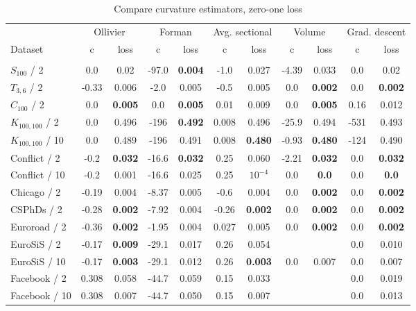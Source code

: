 \documentclass{article} %
\begin{document}
\begin{table}[t]
\caption{Compare curvature estimators, zero-one loss}
\label{tab:compare_zero_one}
\begin{center}
\begin{tabular}{lcccccccc|cc}
&
\multicolumn{2}{c}{Ollivier} &
\multicolumn{2}{c}{Forman} &
\multicolumn{2}{c}{Avg. sectional} &
\multicolumn{2}{c}{Volume} &
\multicolumn{2}{|c}{Grad. descent} 
\\
Dataset & c & loss  & c & loss  & c & loss & c & loss & c & loss  
\\
\hline \\
$S_{100}$ / 2 &
0.0 & 0.02 & 
-97.0 & \textbf{0.004} & 
-1.0 & 0.027 &
-4.39 & 0.033 &
0.0 & 0.02
\\
$T_{3,6}$ / 2 &
-0.33 & 0.006 & 
-2.0 & 0.005 & 
-0.5 & 0.005 & 
0.0 & \textbf{0.002}  &
0.0 & \textbf{0.002}  
\\
$C_{100}$ / 2 & 
0.0 & \textbf{0.005} & 
0.0 & \textbf{0.005} &
0.01 & 0.009 & 
0.0 & \textbf{0.005} &
0.16 & 0.012
\\
$K_{100,100}$ / 2 &
0.0 & 0.496 & 
-196 & \textbf{0.492} & 
0.008 & 0.496 & 
-25.9 & 0.494 & 
-531 & 0.493 
\\
$K_{100,100}$ / 10 &
0.0 & 0.489 & 
-196 & 0.491 & 
0.008 & \textbf{0.480} & 
-0.93 & \textbf{0.480} &
-124 & 0.490 
\\
Conflict / 2 &
-0.2 & \textbf{0.032} &
-16.6 &\textbf{0.032} &
0.25 & 0.060 &
-2.21 & \textbf{0.032} &
0.0 & \textbf{0.032} \\
Conflict / 10 &
-0.2 & 0.001 &
-16.6 &	0.025 &
0.25 & $10^{-4}$ &
0.0 & \textbf{0.0} &
0.0 & \textbf{0.0}  \\
Chicago / 2 &
-0.19 & 0.004 & 
-8.37 & 0.005 & 
-0.6 & 0.004 & 
0.0 & \textbf{0.002} &
0.0 & \textbf{0.002}  \\
CSPhDs / 2 &
-0.28 &	\textbf{0.002} &
-7.92 &	0.004 &
-0.26 & \textbf{0.002} &
0.0 & \textbf{0.002} &
0.0 & \textbf{0.002}  \\
Euroroad / 2 &
-0.36 &	\textbf{0.002} &
-1.95 &	0.004 &
0.027 &	0.005 &
0.0 & \textbf{0.002} &
0.0 & \textbf{0.002} \\
EuroSiS / 2 &
-0.17 & \textbf{0.009} & 
-29.1 & 0.017 & 
0.26 & 0.054 & 
&&
0.0 & 0.010  \\
EuroSiS / 10 &
-0.17 & \textbf{0.003} & 
-29.1 & 0.012 & 
0.26 & \textbf{0.003} & 
0.0 & 0.007 &
0.0 & 0.007\\
Facebook / 2 &
0.308 & 0.058 & 
-44.7 & 0.059 & 
0.15 & 0.033 & 
&&
0.0 & 0.019 \\
Facebook / 10 &
0.308 & 0.007 & 
-44.7 & 0.050 & 
0.15 & 0.007 & 
&&
0.0 & 0.013 \\
\end{tabular}
\end{center}
\end{table}
\end{document}
